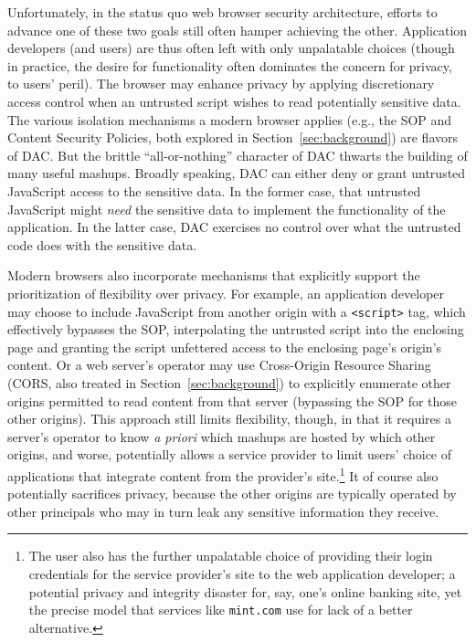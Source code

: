 Unfortunately, in the status quo web browser security architecture,
efforts to advance one of these two goals still often hamper achieving
the other. Application developers (and users) are thus often left with
only unpalatable choices (though in practice, the desire for
functionality often dominates the concern for privacy, to users'
peril). The browser may enhance privacy by applying discretionary
access control when an untrusted script wishes to read
potentially sensitive data. The various isolation mechanisms a modern
browser applies (e.g., the SOP and Content Security Policies,
both explored in Section~\ref{sec:background}) are flavors of DAC. But
the brittle ``all-or-nothing'' character of DAC thwarts the building
of many useful mashups. Broadly speaking, DAC can either deny or grant
untrusted JavaScript access to the sensitive data. In the former case,
that untrusted JavaScript might {\em need} the sensitive data to
implement the functionality of the application. In the latter case,
DAC exercises no control over what the untrusted code does with the
sensitive data.

Modern browsers also incorporate mechanisms that explicitly support
the prioritization of flexibility over privacy. For example, an
application developer may choose to include JavaScript from another
origin with a {\tt <script>} tag, which effectively bypasses the SOP,
interpolating the untrusted script into the enclosing page and
granting the script unfettered access to the enclosing page's origin's
content. Or a web server's operator may use Cross-Origin Resource
Sharing (CORS, also treated in Section~\ref{sec:background}) to
explicitly enumerate other origins permitted to read content from that
server (bypassing the SOP for those other origins). This approach
still limits flexibility, though, in that it requires a server's
operator to know {\em a priori} which mashups are hosted by which
other origins, and worse, potentially allows a service provider to
limit users' choice of applications that integrate content from the
provider's site.\footnote{The user also has the further unpalatable
  choice of providing their login credentials for the service
  provider's site to the web application developer; a potential
  privacy and integrity disaster for, say, one's online banking site,
  yet the precise model that services like {\tt mint.com} use for lack
  of a better alternative.} It of course also potentially sacrifices
privacy, because the other origins are typically operated by other
principals who may in turn leak any sensitive information they
receive.

